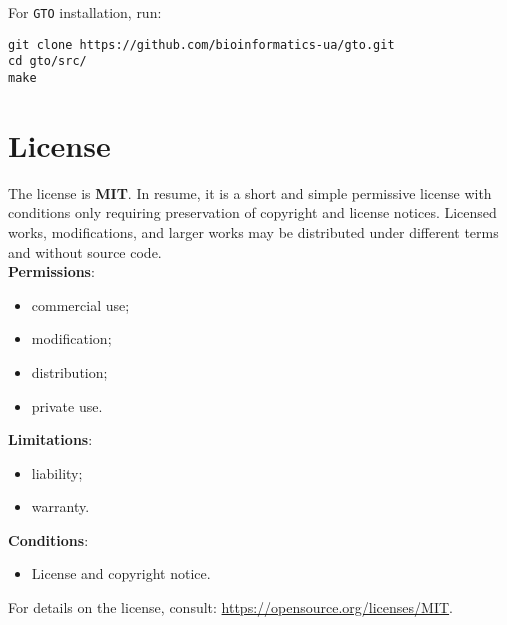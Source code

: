 For \texttt{GTO} installation, run:
\begin{lstlisting}
git clone https://github.com/bioinformatics-ua/gto.git
cd gto/src/
make
\end{lstlisting}

\section{License}

The license is \textbf{MIT}. In resume, it is a short and simple permissive license with conditions only requiring preservation of copyright and license notices. Licensed works, modifications, and larger works may be distributed under different terms and without source code.\\
\textbf{Permissions}:
\begin{itemize}
	\item commercial use;
	\item modification;
	\item distribution;
	\item private use.
\end{itemize}
\textbf{Limitations}:
\begin{itemize}
	\item liability;
	\item warranty.
\end{itemize}
\textbf{Conditions}:
\begin{itemize}
        \item License and copyright notice.
\end{itemize}
For details on the license, consult: \url{https://opensource.org/licenses/MIT}.
